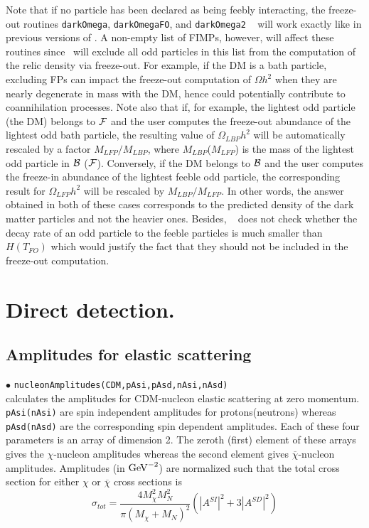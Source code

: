 \documentclass[12pt,a4paper]{article}
\begin{document}
Note that if no particle has been declared as being feebly interacting, the freeze-out routines \verb|darkOmega|, \verb|darkOmegaFO|, and \verb|darkOmega2| ~\cite{Belanger:2014vza} will work exactly like in previous versions of \micro. A non-empty list of FIMPs, however, will affect these routines since \micro~will exclude all odd particles in this list from the computation of the relic density via freeze-out. For example, if the DM is a bath particle, excluding FPs can impact the freeze-out computation of $\Omega h^2$ when they are nearly degenerate in mass with the DM, hence could potentially contribute to coannihilation processes. Note also that if, for example, the lightest odd particle (the DM) belongs to ${\cal F}$ and the user computes the freeze-out abundance of the lightest odd bath particle, the resulting  value of $\Omega_{LBP} h^2$  will be automatically rescaled by a factor $M_{LFP}/M_{LBP}$, where $M_{LBP}$($M_{LFP}$) is the mass of the lightest odd particle in ${\cal B}$ (${\cal F}$). Conversely, if the DM belongs to ${\cal B}$ and the user computes the freeze-in abundance of the lightest feeble odd particle, the corresponding result for $\Omega_{LFP} h^2$ will be rescaled by $M_{LBP}/M_{LFP}$. In other words, the answer obtained in both of these cases corresponds to the predicted density of the dark matter particles and not the heavier ones. Besides, \micro~ does not check whether the decay rate of an odd particle to the feeble particles is much smaller than $H(T_{FO})$ which would justify the fact that they should not be included in the freeze-out computation.



\section{Direct detection.}
\subsection{Amplitudes for elastic scattering}
\noindent
 $\bullet$ \verb|nucleonAmplitudes(CDM,pAsi,pAsd,nAsi,nAsd)|\\
calculates the amplitudes for CDM-nucleon elastic
scattering at zero momentum. \verb|pAsi(nAsi)| are spin
independent amplitudes for protons(neutrons) whereas
\verb|pAsd(nAsd)| are the corresponding spin dependent amplitudes.
Each of these four parameters is an array of 
dimension 2. The zeroth (first) element of these arrays gives the
$\chi$-nucleon amplitudes whereas the second element gives
$\overline{\chi}$-nucleon amplitudes. Amplitudes (in ${\rm GeV}^{-2}$) are normalized
such that the total cross section for either $\chi$ or $\overline
\chi$ cross sections is
\begin{equation}
\sigma_{tot}=\frac{4M_{\chi}^2 M_N^2}{\pi(M_{\chi}+M_N)^2}(|A^{SI}|^2+3|A^{SD}|^2)
\label{eq:norm}
\end{equation}
\end{document}
